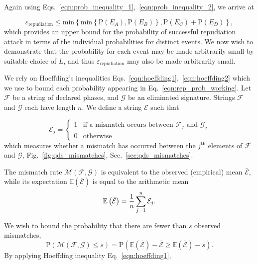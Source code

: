 \noindent Again using Eqs.~\ref{eqn:prob_inequality_1},~\ref{eqn:prob_inequality_2}, we arrive at

\begin{equation}\label{eqn:rep_prob_working}
\varepsilon_{\text{repudiation}} \le \text{min}\left\{
\text{min}\left\{\text{P}\left(E_A\right), \text{P}\left(E_B\right) \right\}, \text{P}\left(E_C\right) + \text{P}\left(E_D\right)\right\},
\end{equation}
which provides an upper bound for the probability of successful repudiation attack in terms of the individual probabilities for distinct events. We now wish to demonstrate that the probability for each event may be made arbitrarily small by suitable choice of $L$, and thus $\varepsilon_{\text{repudiation}}$ may also be made arbitrarily small.


We rely on Hoeffding's inequalities Eqs.~\ref{eqn:hoeffding1},~\ref{eqn:hoeffding2} which we use to bound each probability appearing in Eq.~\ref{eqn:rep_prob_working}. Let $\mathcal{F}$ be a string of declared phases, and $\mathcal{G}$ be an eliminated signature. Strings $\mathcal{F}$ and $\mathcal{G}$ each have length $n$. We define a string $\mathcal{E}$ such that

\begin{equation*}\label{eqn:error}
\mathcal{E}_j = 
\begin{cases}
1 & \text{if a mismatch occurs between $\mathcal{F}_j$ and $\mathcal{G}_j$} \\
0 & \text{otherwise}
\end{cases}
\end{equation*}
which measures whether a mismatch has occurred between the $j^\text{th}$ elements of $\mathcal{F}$ and $\mathcal{G}$, Fig.~\ref{fig:qds_mismatches}, Sec.~\ref{sec:qds_mismatches}.


The mismatch rate $\mathcal{M}\left(\mathcal{F}, \mathcal{G}\right)$ is equivalent to the observed (empirical) mean $\bar{\mathcal{E}}$, while its expectation $\mathbb{E}\left(\bar{\mathcal{E}}\right)$ is equal to the arithmetic mean
\begin{equation}
\mathbb{E}\left(\bar{\mathcal{E}}\right) = \frac{1}{n} \sum_{j=1}^n \mathcal{E}_j. \notag
\end{equation}

\noindent We wish to bound the probability that there are fewer than $s$ observed mismatches,
\begin{equation}
\text{P}\left(\mathcal{M}\left(\mathcal{F}, \mathcal{G}\right) \le s\right) = \text{P}\left( \mathbb{E}\left(\bar{\mathcal{E}}\right) - \bar{\mathcal{E}} \ge \mathbb{E}\left(\bar{\mathcal{E}}\right) - s\right).
\end{equation}
By applying Hoeffding inequality Eq.~\ref{eqn:hoeffding1},

